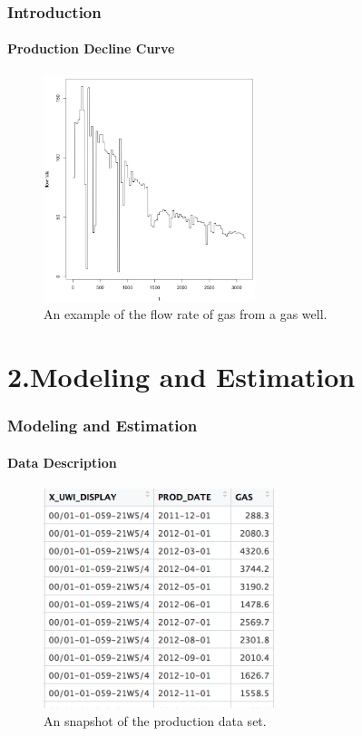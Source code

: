\documentclass[11pt]{beamer}
\begin{document}
\begin{frame}
	\frametitle{Introduction}
	\framesubtitle{Production Decline Curve}
	\justifying
	\begin{figure}
		\begin{center}
			\includegraphics[width=0.55\textwidth ]{decline} 
			\caption{An example of the flow rate of gas from a gas well.}\label{smooth}
		\end{center}
	\end{figure}
\end{frame}		



\section{2.Modeling and Estimation}	
	
\begin{frame}
	\frametitle{Modeling and Estimation}
	\framesubtitle{Data Description}
	\justifying
	\begin{figure}
		\begin{center}
			\includegraphics[width=0.6\textwidth  ]{data} 
			\caption{An snapshot of the production data set.}
		\end{center}
	\end{figure}	
\end{frame}		
		
\end{document}
